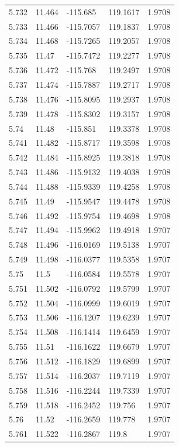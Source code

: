 \begin{tabular}{lllll}
5.732 & 11.464 & -115.685 & 119.1617 & 1.9708 \\
5.733 & 11.466 & -115.7057 & 119.1837 & 1.9708 \\
5.734 & 11.468 & -115.7265 & 119.2057 & 1.9708 \\
5.735 & 11.47 & -115.7472 & 119.2277 & 1.9708 \\
5.736 & 11.472 & -115.768 & 119.2497 & 1.9708 \\
5.737 & 11.474 & -115.7887 & 119.2717 & 1.9708 \\
5.738 & 11.476 & -115.8095 & 119.2937 & 1.9708 \\
5.739 & 11.478 & -115.8302 & 119.3157 & 1.9708 \\
5.74 & 11.48 & -115.851 & 119.3378 & 1.9708 \\
5.741 & 11.482 & -115.8717 & 119.3598 & 1.9708 \\
5.742 & 11.484 & -115.8925 & 119.3818 & 1.9708 \\
5.743 & 11.486 & -115.9132 & 119.4038 & 1.9708 \\
5.744 & 11.488 & -115.9339 & 119.4258 & 1.9708 \\
5.745 & 11.49 & -115.9547 & 119.4478 & 1.9708 \\
5.746 & 11.492 & -115.9754 & 119.4698 & 1.9708 \\
5.747 & 11.494 & -115.9962 & 119.4918 & 1.9707 \\
5.748 & 11.496 & -116.0169 & 119.5138 & 1.9707 \\
5.749 & 11.498 & -116.0377 & 119.5358 & 1.9707 \\
5.75 & 11.5 & -116.0584 & 119.5578 & 1.9707 \\
5.751 & 11.502 & -116.0792 & 119.5799 & 1.9707 \\
5.752 & 11.504 & -116.0999 & 119.6019 & 1.9707 \\
5.753 & 11.506 & -116.1207 & 119.6239 & 1.9707 \\
5.754 & 11.508 & -116.1414 & 119.6459 & 1.9707 \\
5.755 & 11.51 & -116.1622 & 119.6679 & 1.9707 \\
5.756 & 11.512 & -116.1829 & 119.6899 & 1.9707 \\
5.757 & 11.514 & -116.2037 & 119.7119 & 1.9707 \\
5.758 & 11.516 & -116.2244 & 119.7339 & 1.9707 \\
5.759 & 11.518 & -116.2452 & 119.756 & 1.9707 \\
5.76 & 11.52 & -116.2659 & 119.778 & 1.9707 \\
5.761 & 11.522 & -116.2867 & 119.8 & 1.9707 \\

\end{tabular}
